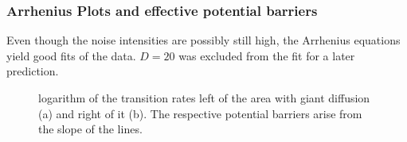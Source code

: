 \documentclass[12pt,a4paper]{article}
\begin{document}
\subsubsection{Arrhenius Plots and effective potential barriers}
Even though the noise intensities are possibly still high, the Arrhenius equations yield good fits of the data. $D=20$ was excluded from the fit for a later prediction.
\begin{figure}[H]
	\hspace*{-0.5cm}
	\caption{logarithm of the transition rates left of the area with giant diffusion (a) and right of it (b). The respective potential barriers arise from the slope of the lines.}
	\label{arrhplotsrinzel}
\end{figure}
\end{document}

